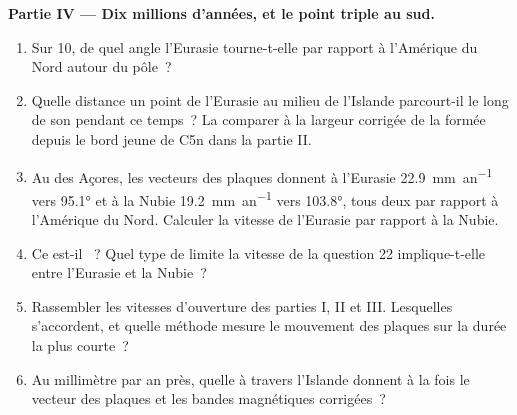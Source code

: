 \begin{problem}
\noindent\textbf{Partie IV --- Dix millions d'années, et le point triple au sud.}
\begin{enumerate}[resume]
  \item Sur \qty{10}{\Ma}, de quel angle l'Eurasie tourne-t-elle par rapport à
        l'Amérique du Nord autour du pôle~?
  \item Quelle distance un point de l'Eurasie au milieu de l'Islande parcourt-il le long de
        son  pendant ce temps~? La comparer à la largeur corrigée de la
         formée depuis le bord jeune de C5n dans la partie II.
  \item Au  des Açores, les vecteurs des plaques donnent à l'Eurasie
        \qty{22.9}{mm.an^{-1}} vers \ang{95.1} et à la Nubie
        \qty{19.2}{mm.an^{-1}} vers \ang{103.8}, tous deux par rapport à l'Amérique du
        Nord. Calculer la vitesse de l'Eurasie par rapport à la Nubie.
  \item Ce  est-il ~? Quel type de limite la vitesse de la
        question 22 implique-t-elle entre l'Eurasie et la Nubie~?
  \item Rassembler les vitesses d'ouverture des parties I, II et III. Lesquelles s'accordent, et
        quelle méthode mesure le mouvement des plaques sur la durée la plus courte~?
  \item Au millimètre par an près, quelle  à travers
        l'Islande donnent à la fois le vecteur des plaques et les bandes magnétiques
        corrigées~?
\end{enumerate}
\end{problem}
